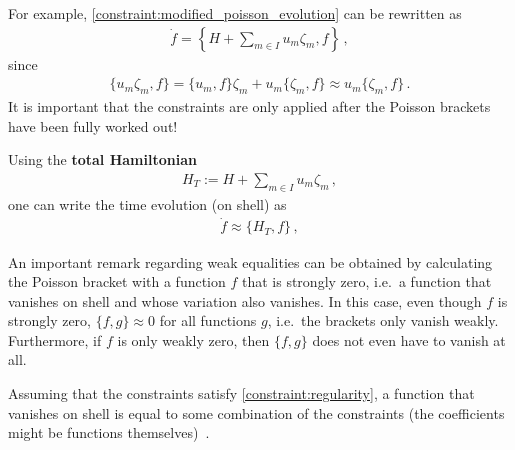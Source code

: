     For example, \cref{constraint:modified_poisson_evolution} can be rewritten as
    \begin{gather}
        \dot{f} = \left\{H + \sum_{m\in I}u_m\zeta_m,f\right\}\,,
    \end{gather}
    since
    \begin{gather}
        \{u_m\zeta_m, f\} = \{u_m,f\}\zeta_m + u_m\{\zeta_m,f\}\approx u_m\{\zeta_m,f\}\,.
    \end{gather}
    It is important that the constraints are only applied after the Poisson brackets have been fully worked out!

    Using the \textbf{total Hamiltonian}
    \begin{gather}
        \label{constraint:total_hamiltonian}
        H_T := H + \sum_{m\in I}u_m\zeta_m\,,
    \end{gather}
    one can write the time evolution (on shell) as
    \begin{gather}
        \dot{f}\approx\{H_T,f\}\,,
    \end{gather}

    \begin{remark}[Closure]
        An important remark regarding weak equalities can be obtained by calculating the Poisson bracket with a function $f$ that is strongly zero, i.e.~a function that vanishes on shell and whose variation also vanishes. In this case, even though $f$ is strongly zero, $\{f,g\}\approx0$ for all functions $g$, i.e.~the brackets only vanish weakly. Furthermore, if $f$ is only weakly zero, then $\{f,g\}$ does not even have to vanish at all.
    \end{remark}

    \begin{property}\label{constraint:weakly_vanishing_functions}
        Assuming that the constraints satisfy \cref{constraint:regularity}, a function that vanishes on shell is equal to some combination of the constraints (the coefficients might be functions themselves)~\citep[p.~70]{henneaux_quantization_1992}.
    \end{property}

